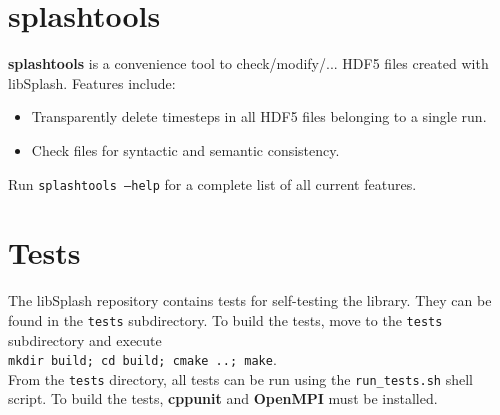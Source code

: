 \documentclass[a4paper,10pt,BCOR12mm]{report}
\newcommand{\command}[1]{\small \texttt{#1}}
\begin{document}
\section{splashtools}

\textbf{splashtools} is a convenience tool to check/modify/... HDF5 files created with libSplash.
Features include:
\begin{itemize}
	\item Transparently delete timesteps in all HDF5 files belonging to a single run.
	\item Check files for syntactic and semantic consistency.
\end{itemize}
Run \command{splashtools --help} for a complete list of all current features.


\section{Tests}

The libSplash repository contains tests for self-testing the library. They can be found in the
\command{tests} subdirectory. To build the tests, move to the \command{tests} subdirectory and execute\\
\command{mkdir build; cd build; cmake ..; make}.\\
From the \command{tests} directory, all tests can be run using the \command{run\_tests.sh} shell script.
To build the tests, \textbf{cppunit} and \textbf{OpenMPI} must be installed.

\end{document}
